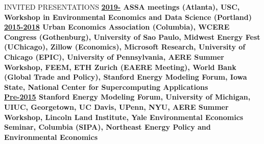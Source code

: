 \documentclass{resume} %
\begin{document}

\begin{rSection}{INVITED PRESENTATIONS}
\bf{\underline{2019-} ASSA meetings (Atlanta), USC, Workshop in Environmental Economics and Data Science (Portland)} \\

\bf{\underline{2015-2018}} Urban Economics Association (Columbia), WCERE Congress (Gothenburg), University of Sao Paulo, Midwest Energy Fest (UChicago), Zillow (Economics), Microsoft Research, University of Chicago (EPIC), University of Pennsylvania, AERE Summer Workshop, FEEM, ETH Zurich (EAERE Meeting), World Bank (Global Trade and Policy), Stanford Energy Modeling Forum, Iowa State,
National Center for Supercomputing Applications  \\

\bf{\underline{Pre-2015}} Stanford Energy Modeling Forum, University of Michigan, UIUC, Georgetown, UC Davis,
UPenn, NYU, AERE Summer Workshop, Lincoln Land Institute, Yale Environmental Economics Seminar, Columbia
(SIPA), Northeast Energy Policy and Environmental Economics \\

\end{rSection}
















\end{document}
